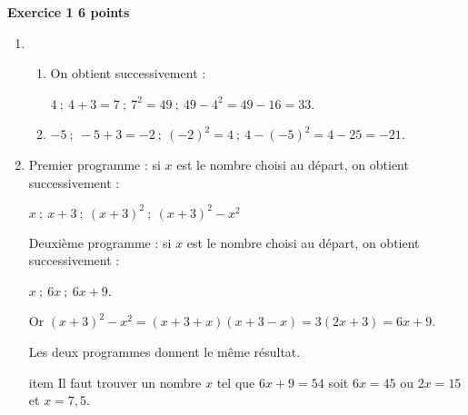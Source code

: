 \textbf{Exercice 1 \hfill 6 points}

\medskip

\begin{enumerate}
\item %


	\begin{enumerate}
		\item %
		On obtient successivement :
		
		$4~;~4 + 3 = 7~;~7^2 = 49~;~49 - 4^2 = 49 - 16 = 33$.
		\item %
		$- 5~;~- 5 + 3 = - 2~;~(- 2)^2 = 4~;~4 - (- 5)^2 = 4 - 25 = - 21$.
	\end{enumerate}
\item %

%
Premier programme : si $x$ est le nombre choisi au départ, on obtient successivement :

$x~;~x + 3~;~(x + 3)^2~;~(x + 3)^2 - x^2 $

Deuxième programme : si $x$ est le nombre choisi au départ, on obtient successivement :

$x~;~6x~;~6x + 9$.

Or $(x + 3)^2 - x^2 = (x + 3 + x)(x + 3 - x) = 3(2x + 3) = 6x + 9$.

Les deux programmes donnent le même résultat.

item %
Il faut trouver un nombre $x$ tel que $6x + 9 = 54$ soit $6x = 45$ ou $2x = 15$ et $x = 7,5$.
\end{enumerate}
 
\vspace{0,5cm}

